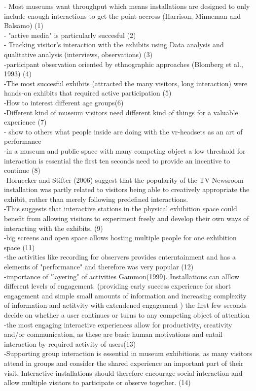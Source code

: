 - Most museums want throughput which means installations are designed to only include enough interactions to get the point accross
(Harrison, Minneman and Balsamo) (1)
\\
- "active media" is particularly succesful (2)
\\
- Tracking visitor's interaction with the exhibits using Data analysis and qualitative analysis (interviews, observations) (3)
\\
-participant observation oriented by ethnographic approaches (Blomberg et al., 1993) (4)
\\
-The most succesful exhibits (attracted the many visitors, long interaction) were hands-on exhibits that required active
participation (5)
\\
-How to interest different age groups(6)
\\
-Different kind of museum visitors need different kind of things for a valuable experience (7)
\\
- show to others what people inside are doing with the vr-headsets as an art of performance
\\
-in a museum and public space with many competing object a low threshold for interaction is essential the first ten seconds need to provide an incentive to continue (8)
\\
-Hornecker and Stifter (2006) suggest that the popularity of the TV Newsroom installation was partly related to visitors being able to creatively appropriate the exhibit, rather than merely following predefined interactions.
\\
-This suggests that interactive stations in the physical exhibition space could benefit from allowing visitors to experiment freely and develop their own ways of interacting with the exhibits. (9)
\\
-big screens and open space allows hosting multiple people for one exhibition space (11)
\\
-the activities like recording for observers provides enterntainment and has a elements of "performance" and therefore was very popular (12)
\\
-importance of "layering" of activities Gammon(1999). Installations can alllow different levels of engagement. (providing early success experience for short engagement and simple small amounts of information and increasing complexity of information and actitvity with extendened engagement )
the first few seconds decide on whether a user continues or turns to any competing object of attention
\\
-the most engaging interactive experiences allow for productivity, creativity and/or communication, as these are basic human motivations and entail interaction by required activity of users(13)
\\
-Supporting group interaction is essential in museum exhibitions, as many visitors attend in groups and consider the shared experience an important part of their visit. Interactive installations should therefore encourage social interaction and allow multiple visitors to participate or observe together. (14)
